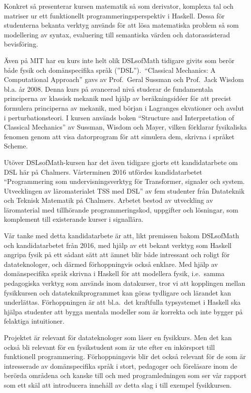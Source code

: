 \documentclass[12pt,a4paper]{article}
\begin{document}
Konkret så presenterar kursen matematik så som derivator, komplexa
tal och matriser ur ett funktionellt programmeringsperspektiv i
Haskell. Dessa för studenterna bekanta verktyg används för att lösa
matematiska problem så som modellering av syntax, evaluering till
semantiska värden och datorassisterad bevisföring.

Även på MIT har en kurs inte helt olik DSLsofMath tidigare givits som berör både
fysik och domänspecifika språk (''DSL'').\ ``Classical Mechanics: A Computational Approach'' gavs av
Prof.\ Geral Sussman och Prof.\ Jack Wisdom bl.a. år
2008.\cite{classical-mechanics-course-mit-2008}
Denna kurs på avancerad nivå studerar de fundamentala principerna av klassisk
mekanik med hjälp av beräkningsidéer för att precist formulera principerna av
mekanik, med början i Lagranges ekvationer och avslut i
perturbationsteori. I kursen används boken ``Structure and
Interpretation of Classical Mechanics'' av Sussman, Wisdom och Mayer,
vilken förklarar fysikaliska fenomen genom att visa datorprogram för att
simulera dem, skrivna i språket Scheme.\cite{SICM}

Utöver DSLsofMath-kursen har det även tidigare gjorts ett kandidatarbete om DSL 
här på Chalmers. Vårterminen 2016 utfördes kandidatarbetet
``Programmering som undervisningsverktyg för Transformer, signaler och
system. Utvecklingen av läromaterialet TSS med DSL'' av fem studenter
från Datateknik och Teknisk Matematik på Chalmers. Arbetet bestod av
utveckling av läromaterial med tillhörande programmeringskod,
uppgifter och lösningar, som komplement till existerande kurser i
signallära.\cite{kandidat2016}

Vår tanke med detta kandidatarbete är att, likt premissen bakom DSLsofMath
och kandidatarbetet från 2016, med hjälp av ett bekant verktyg
som Haskell angripa fysik på ett sådant sätt att ämnet blir både
intressant och roligt för datateknologer, och därmed förhoppningvis
också enklare. Med hjälp av domänspecifika språk skrivna i Haskell för att
modellera fysik, i.e.\ samma pedagogiska verktyg som används inom
datakurser, tror vi att kopplingen mellan fysikkursen och
datateknikprogrammet kan göras tydligare och lärandet kan underlättas.
Förhoppningen är att bl.a.\ det kraftfulla typsystemet i Haskell ska
hjälpa studenter att bygga mentala modeller som är korrekta och inte
bygger på felaktiga intuitioner.

Projektet är relevant för datateknologer som läser en fysikkurs. Men
det kan också bli relevant för en fysikstudent som är ute efter en
inkörsport till funktionell programmering. Förhoppningsvis blir det
också relevant för de som är intresserade av domänspecifika språk i
stort, pedagoger och föreläsare inom de berörda områdena och kanske
till och med programledningen som ser vår rapport som ett skäl att
introducera innehåll av detta slag i till exempel fysikkursen.
\end{document}
